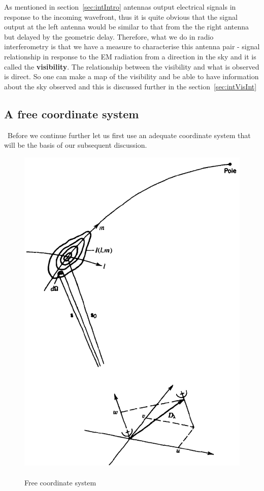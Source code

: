 As mentioned in section~\ref{sec:intIntro} antennas output electrical signals in response to the incoming wavefront, thus it is quite obvious that the signal output at the left antenna would be similar to that from the the right antenna but delayed by the geometric delay. Therefore, what we do in radio interferometry is that we have a measure to characterise this antenna pair - signal relationship in response to the EM radiation from a direction in the sky and it is called the \textbf{visibility}.
The relationship between the visibility and what is observed is direct. So one can make a map of the visibility and be able to have information about the sky observed and this is discussed further in the section~\ref{sec:intVisInt}
\subsection{A free coordinate system}
\label{sec:intFreeCoor}
{\citep[From][Sec.~3.1,~Pgs.~68-71]{thompson2008interferometry}}~Before we continue further let us first use an adequate coordinate system that will be the basis of our subsequent discussion.
\begin{figure}[htbp]
\center
    \includegraphics[scale= 0.9]{Figures/freeCoor}
 	\caption[Free coordinate system]{\\Free coordinate system~\citep[Pg.~70,~Fig.~3.2]{thompson2008interferometry}}
	\label{fig:freeCoor}
\end{figure}
